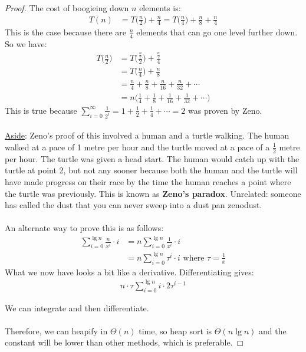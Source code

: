 \documentclass[]{article}
\theoremstyle{definition}
\begin{document}
\begin{proof}
				The cost of boogieing down $n$ elements is:
				\begin{align*}
					T(n) &= T\bigg(\frac{n}{2}\bigg) + \frac{n}{4} = T\bigg(\frac{n}{4}\bigg) + \frac{n}{8} + \frac{n}{4}
				\end{align*}
				This is the case because there are $\frac{n}{4}$ elements that can go one level further down. So we have:
				\begin{align*}
					T\bigg(\frac{n}{2}\bigg) &= T\bigg(\frac{\frac{n}{2}}{2}\bigg) + \frac{\frac{n}{2}}{4} \\
					&= T\bigg(\frac{n}{4}\bigg) + \frac{n}{8} \\
					&= \frac{n}{4} + \frac{n}{8} + \frac{n}{16} + \frac{n}{32} + \cdots \\
					&= n\bigg(\frac{1}{4} + \frac{1}{8} + \frac{1}{16} + \frac{1}{32} + \cdots\bigg)
				\end{align*}
				This is true because $\sum_{i = 0}^{\infty} \frac{1}{2^i} = 1 + \frac{1}{2} + \frac{1}{4} + \cdots = 2$ was proven by Zeno.
				\\ \\
				\underline{Aside}: Zeno's proof of this involved a human and a turtle walking. The human walked at a pace of 1 metre per hour and the turtle moved at a pace of a $\frac{1}{2}$ metre per hour. The turtle was given a head start. The human would catch up with the turtle at point 2, but not any sooner because both the human and the turtle will have made progress on their race by the time the human reaches a point where the turtle was previously. This is known as \textbf{Zeno's paradox}. Unrelated: someone has called the dust that you can never sweep into a dust pan zenodust.
				\\ \\
				An alternate way to prove this is as follows:
				\begin{align*}
					\sum_{i = 0}^{\lg n} \frac{n}{x^i} \cdot i &= n \sum_{i = 0}^{\lg n} \frac{1}{x^i} \cdot i \\
					&= n \sum_{i = 0}^{\lg n} \tau^i \cdot i \text{ where } \tau = \frac{1}{x}
				\end{align*}
				What we now have looks a bit like a derivative. Differentiating gives:
				\begin{align*}
					n \cdot \tau \sum_{i = 0}^{\lg n} i \cdot 2 \tau^{i - 1}
				\end{align*}

				We can integrate and then differentiate.
				\\ \\
				Therefore, we can heapify in $\Theta(n)$ time, so heap sort is $\Theta(n \lg n)$ and the constant will be lower than other methods, which is preferable.
			\end{proof}
\end{document}

